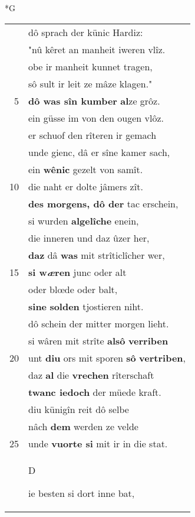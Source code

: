 \documentclass[8pt,a4paper,notitlepage]{article}
\begin{document}
\newpage
\begin{table}[ht]
\begin{minipage}[t]{0.5\linewidth}
\small
\begin{center}*G
\end{center}
\begin{tabular}{rl}
 & dô sprach der künic Hardiz:\\ 
 & "nû kêret an manheit iweren vlîz.\\ 
 & obe ir manheit kunnet tragen,\\ 
 & sô sult ir leit ze mâze klagen."\\ 
5 & \textbf{dô was sîn kumber} \textbf{al}ze grôz.\\ 
 & ein güsse im von den ougen vlôz.\\ 
 & er schuof den rîteren ir gemach\\ 
 & unde gienc, dâ er sîne kamer sach,\\ 
 & ein \textbf{wênic} gezelt von samît.\\ 
10 & die naht er dolte jâmers zît.\\ 
 & \textbf{des morgens, dô der} tac erschein,\\ 
 & si wurden \textbf{algelîche} enein,\\ 
 & die inneren und daz ûzer her,\\ 
 & \textbf{daz} dâ \textbf{was} mit strîticlîcher wer,\\ 
15 & \textbf{si w\textit{æ}ren} junc oder alt\\ 
 & oder blœde oder balt,\\ 
 & \textbf{si}\textbf{ne} \textbf{solden} tjostieren niht.\\ 
 & dô schein der mitter morgen lieht.\\ 
 & si wâren mit strîte \textbf{alsô} \textbf{verriben}\\ 
20 & unt \textbf{diu} ors mit sporen \textbf{sô} \textbf{vertriben},\\ 
 & daz \textbf{al} die \textbf{vrechen} rîterschaft\\ 
 & \textbf{twanc iedoch} der müede kraft.\\ 
 & diu künigîn reit dô selbe\\ 
 & nâch \textbf{dem} werden ze velde\\ 
25 & unde \textbf{vuorte si} mit ir in die stat.\\ 
 & \begin{large}D\end{large}ie besten si dort inne bat,\\ 

\end{tabular}
\end{minipage}
\end{table}
\end{document}
